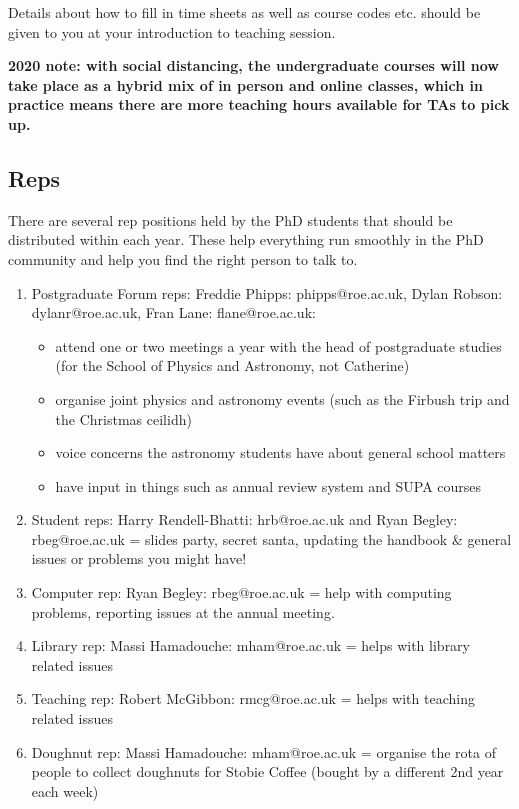 Details about how to fill in time sheets as well as course codes etc. should be given to you at your introduction to teaching session.

{\bf 2020 note: with social distancing, the undergraduate courses will now take place as a hybrid mix of in person and online classes, which in practice means there are more teaching hours available for TAs to pick up.}

\subsection{Reps}

There are several rep positions held by the PhD students that should
be distributed within each year.  These help everything run smoothly
in the PhD community and help you find the right person to talk to.

\begin{enumerate}

\item Postgraduate Forum reps: Freddie Phipps: 	phipps@roe.ac.uk, Dylan Robson: dylanr@roe.ac.uk, Fran Lane: flane@roe.ac.uk:
\begin{itemize}
    \item attend one or two meetings a year with the head of postgraduate studies (for the School of Physics and Astronomy, not Catherine)
    \item organise joint physics and astronomy events (such as the Firbush trip and the Christmas ceilidh)
    \item voice concerns the astronomy students have about general school matters
    \item have input in things such as annual review system and SUPA courses
\end{itemize}
\item Student reps: Harry Rendell-Bhatti: hrb@roe.ac.uk and Ryan Begley: rbeg@roe.ac.uk = slides party, secret santa, updating the handbook \& general issues or problems you might have!
\item Computer rep: Ryan Begley: rbeg@roe.ac.uk = help with computing problems, reporting issues at the annual meeting.
\item Library rep: Massi Hamadouche: mham@roe.ac.uk = helps with library related issues
\item Teaching rep: Robert McGibbon: rmcg@roe.ac.uk = helps with teaching related issues
\item Doughnut rep: Massi Hamadouche: mham@roe.ac.uk = organise the rota of people to collect doughnuts for Stobie Coffee (bought by a different 2nd year each week)


\end{enumerate}



